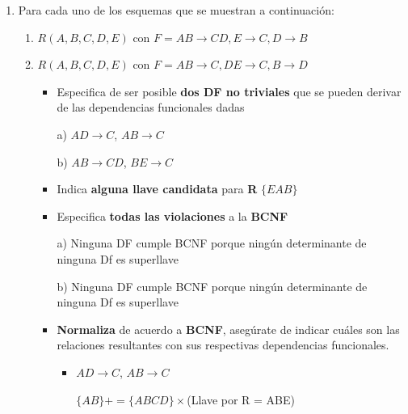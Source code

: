 \documentclass{article}
\begin{document}
\begin{enumerate}
\begin{itemize}
        $AF \rightarrow HB$  Si porque $ AF \rightarrow B $ y  $ F \rightarrow CH$
        
        $A \rightarrow F$ NO porque A no deriva a BC y es la que deriva a F
        
    \end{itemize}
    
    
    \item Para cada uno de los esquemas que se muestran a continuación:
    \begin{enumerate}
        \item $R (A, B, C, D, E)$ con $F = {AB \rightarrow CD, E \rightarrow C, D \rightarrow B}$
        
        \item $R (A, B, C, D, E)$ con $F = {AB \rightarrow C, DE \rightarrow C, B \rightarrow D}$
        
        \begin{itemize}
            \item Especifica de ser posible \textbf{dos DF no triviales} que se pueden derivar de las dependencias funcionales dadas
            
            a) $AD \rightarrow C$, $AB\rightarrow C$
            
            b) $AB \rightarrow CD$, $BE \rightarrow C$
            
            \item Indica \textbf{alguna llave candidata} para \textbf{R}
            $\{E A B\}$
            \item Especifica \textbf{todas las violaciones} a la \textbf{BCNF}
            
            a) Ninguna DF cumple BCNF porque ningún determinante de ninguna Df es superllave
            
            b) Ninguna DF cumple BCNF porque ningún determinante de ninguna Df es superllave
            
            \item \textbf{Normaliza} de acuerdo a \textbf{BCNF}, asegúrate de indicar cuáles son las relaciones resultantes con sus respectivas dependencias funcionales.
            
            \begin{itemize}
                \item $AD \rightarrow C$, $AB\rightarrow C$
                
                $\{AB \}+=\{ABCD\}\times$(Llave por R = ABE)
                

\end{itemize}
\end{itemize}
\end{enumerate}
\end{enumerate}
\end{document}
